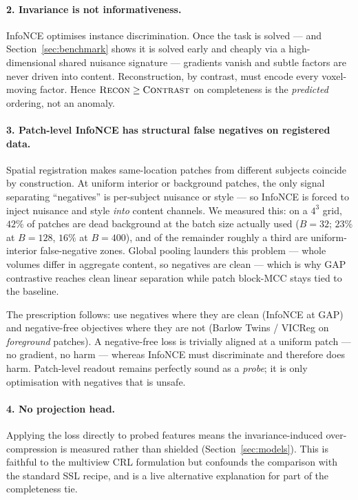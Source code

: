 \documentclass[11pt]{article}
\begin{document}
\paragraph{2. Invariance is not informativeness.} InfoNCE optimises instance
discrimination. Once the task is solved --- and Section~\ref{sec:benchmark}
shows it is solved early and cheaply via a high-dimensional shared nuisance
signature --- gradients vanish and subtle factors are never driven into content.
Reconstruction, by contrast, must encode every voxel-moving factor. Hence
$\textsc{Recon} \geq \textsc{Contrast}$ on completeness is the \emph{predicted}
ordering, not an anomaly.

\paragraph{3. Patch-level InfoNCE has structural false negatives on registered
data.} Spatial registration makes same-location patches from different subjects
coincide by construction. At uniform interior or background patches, the only
signal separating ``negatives'' is per-subject nuisance or style --- so InfoNCE
is forced to inject nuisance and style \emph{into} content channels. We measured
this: on a $4^3$ grid, $42\%$ of patches are dead background at the batch size
actually used ($B{=}32$; $23\%$ at $B{=}128$, $16\%$ at $B{=}400$), and of the
remainder roughly a third are uniform-interior false-negative zones. Global
pooling launders this problem --- whole volumes differ in aggregate content, so
negatives are clean --- which is why GAP contrastive reaches clean linear
separation while patch block-MCC stays tied to the baseline.

The prescription follows: use negatives where they are clean (InfoNCE at GAP)
and negative-free objectives where they are not (Barlow Twins / VICReg on
\emph{foreground} patches). A negative-free loss is trivially aligned at a
uniform patch --- no gradient, no harm --- whereas InfoNCE must discriminate and
therefore does harm. Patch-level readout remains perfectly sound as a
\emph{probe}; it is only optimisation with negatives that is unsafe.

\paragraph{4. No projection head.} Applying the loss directly to probed features
means the invariance-induced over-compression is measured rather than shielded
(Section~\ref{sec:models}). This is faithful to the multiview CRL formulation
but confounds the comparison with the standard SSL recipe, and is a live
alternative explanation for part of the completeness tie.
\end{document}
